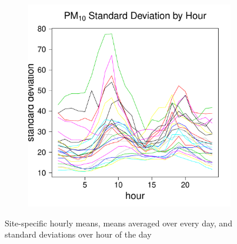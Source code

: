 \documentclass[alpha-refs]{wiley-article}
\begin{document}
\begin{figure}[H]
\begin{center}
\begin{subfigure}[b]{.3\textwidth}
            \label{fig:day_mean_pm10}
         \end{subfigure}
           \begin{subfigure}[b]{.3\textwidth}
      \includegraphics[width=\textwidth]{hour_sd_PM10}
            \label{fig:hour_sd_pm10}
         \end{subfigure}
  \end{center}
  \vspace{-5mm}
       \caption{Site-specific  hourly means, means averaged over every day, and standard deviations over hour of the day}\label{fig:pm10}
\end{figure}
\vspace{-5mm}
\end{document}
